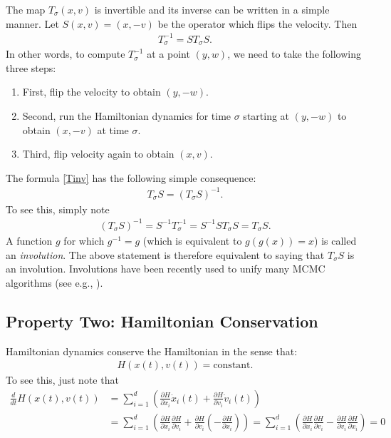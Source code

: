 \documentclass{scrartcl}
\begin{document}
The map $T_{\sigma}(x, v)$ is invertible and its inverse can be
written in a simple manner. Let $S(x, v) = (x, -v)$ be the operator
which flips the velocity. Then
\begin{align}\label{Tinv}
  T_{\sigma}^{-1} = S T_{\sigma} S. 
\end{align}
In other words, to compute $T_{\sigma}^{-1}$ at a point $(y, w)$, we
need to take the following three steps:
\begin{enumerate}
\item First, flip the velocity to obtain $(y, -w)$.
\item Second, run the Hamiltonian dynamics for time $\sigma$ starting
  at $(y, -w)$ to obtain $(x, -v)$ at time $\sigma$.
\item Third, flip velocity again to obtain $(x, v)$. 
\end{enumerate}
The formula \eqref{Tinv} has the following simple consequence:
\begin{align}
  \label{invo}
  T_{\sigma} S = (T_{\sigma} S)^{-1}. 
\end{align}
To see this, simply note
\begin{align*}
  (T_{\sigma} S)^{-1} = S^{-1} T_{\sigma}^{-1} = S^{-1} S T_{\sigma} S
  = T_{\sigma} S. 
\end{align*}
A function $g$ for which $g^{-1} = g$ (which is equivalent to $g(g(x))
= x$) is called an \textit{involution}. The above statement is
therefore equivalent to saying that $T_{\sigma} S$ is an
involution. Involutions have been recently used to unify many MCMC
algorithms (see e.g., \citet{glatt2024sacred}).

\subsection{Property Two: Hamiltonian Conservation}

Hamiltonian dynamics conserve the Hamiltonian in the sense that:
\begin{align}\label{ham_const}
  H(x(t), v(t)) = \text{constant}. 
\end{align}
To see this, just note that
\begin{align*}
  \frac{d}{dt} H(x(t), v(t)) &= \sum_{i=1}^d \left( \frac{\partial H}{\partial
                               x_i} \dot{x}_i(t) + \frac{\partial
                               H}{\partial v_i} \dot{v}_i(t) \right) \\
  &= \sum_{i=1}^d \left(\frac{\partial H}{\partial x_i} \frac{\partial
    H}{\partial v_i} + \frac{\partial H}{\partial v_i} \left(-
    \frac{\partial H}{\partial x_i}\right) \right) = \sum_{i=1}^d \left(\frac{\partial H}{\partial x_i} \frac{\partial
    H}{\partial v_i} - \frac{\partial H}{\partial v_i} 
    \frac{\partial H}{\partial x_i} \right) = 0
\end{align*}
\end{document}
